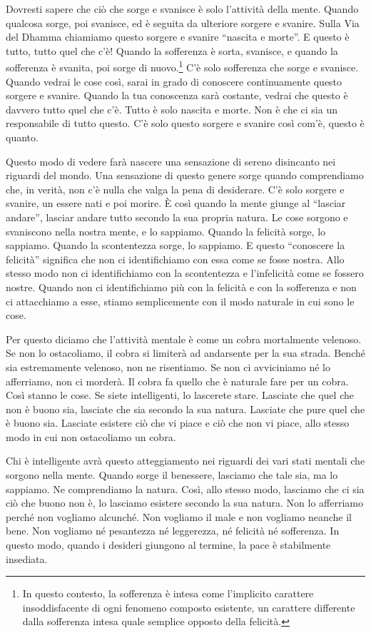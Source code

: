 Dovresti sapere che ciò che sorge e svanisce è solo l'attività della
mente. Quando qualcosa sorge, poi svanisce, ed è seguita da ulteriore
sorgere e svanire. Sulla Via del Dhamma chiamiamo questo sorgere e
svanire ``nascita e morte''. E questo è tutto, tutto quel che c'è!
Quando la sofferenza è sorta, svanisce, e quando la sofferenza è
svanita, poi sorge di nuovo.\footnote{In questo contesto, la sofferenza
  è intesa come l'implicito carattere insoddisfacente di ogni fenomeno
  composto esistente, un carattere differente dalla sofferenza intesa
  quale semplice opposto della felicità.} C'è solo sofferenza che sorge
e svanisce. Quando vedrai le cose così, sarai in grado di conoscere
continuamente questo sorgere e svanire. Quando la tua conoscenza sarà
costante, vedrai che questo è davvero tutto quel che c'è. Tutto è solo
nascita e morte. Non è che ci sia un responsabile di tutto questo. C'è
solo questo sorgere e svanire così com'è, questo è quanto.

Questo modo di vedere farà nascere una sensazione di sereno disincanto
nei riguardi del mondo. Una sensazione di questo genere sorge quando
comprendiamo che, in verità, non c'è nulla che valga la pena di
desiderare. C'è solo sorgere e svanire, un essere nati e poi morire. È
così quando la mente giunge al ``lasciar andare'', lasciar andare tutto
secondo la sua propria natura. Le cose sorgono e svaniscono nella nostra
mente, e lo sappiamo. Quando la felicità sorge, lo sappiamo. Quando la
scontentezza sorge, lo sappiamo. E questo ``conoscere la felicità''
significa che non ci identifichiamo con essa come se fosse nostra. Allo
stesso modo non ci identifichiamo con la scontentezza e l'infelicità
come se fossero nostre. Quando non ci identifichiamo più con la felicità
e con la sofferenza e non ci attacchiamo a esse, stiamo semplicemente
con il modo naturale in cui sono le cose.

Per questo diciamo che l'attività mentale è come un cobra mortalmente
velenoso. Se non lo ostacoliamo, il cobra si limiterà ad andarsente per
la sua strada. Benché sia estremamente velenoso, non ne risentiamo. Se
non ci avviciniamo né lo afferriamo, non ci morderà. Il cobra fa quello
che è naturale fare per un cobra. Così stanno le cose. Se siete
intelligenti, lo lascerete stare. Lasciate che quel che non è buono sia,
lasciate che sia secondo la sua natura. Lasciate che pure quel che è
buono sia. Lasciate esistere ciò che vi piace e ciò che non vi piace,
allo stesso modo in cui non ostacoliamo un cobra.

Chi è intelligente avrà questo atteggiamento nei riguardi dei vari stati
mentali che sorgono nella mente. Quando sorge il benessere, lasciamo che
tale sia, ma lo sappiamo. Ne comprendiamo la natura. Così, allo stesso
modo, lasciamo che ci sia ciò che buono non è, lo lasciamo esistere
secondo la sua natura. Non lo afferriamo perché non vogliamo alcunché.
Non vogliamo il male e non vogliamo neanche il bene. Non vogliamo né
pesantezza né leggerezza, né felicità né sofferenza. In questo modo,
quando i desideri giungono al termine, la pace è stabilmente insediata.

